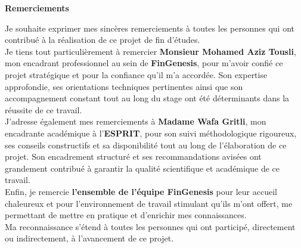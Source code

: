 \begin{titlepage}
\begin{center}

\vspace*{6cm} %

\textbf{\Large Remerciements}

\vspace{1cm}

\begin{itshape} %

Je souhaite exprimer mes sincères remerciements à toutes les personnes qui ont contribué à la réalisation de ce projet de fin d'études.\\[0.7cm]

Je tiens tout particulièrement à remercier \textbf{Monsieur Mohamed Aziz Tousli}, mon encadrant professionnel au sein de \textbf{FinGenesis}, pour m'avoir confié ce projet stratégique et pour la confiance qu'il m'a accordée. Son expertise approfondie, ses orientations techniques pertinentes ainsi que son accompagnement constant tout au long du stage ont été déterminants dans la réussite de ce travail.\\[0.5cm]

J'adresse également mes remerciements à \textbf{Madame Wafa Gritli}, mon encadrante académique à l'\textbf{ESPRIT}, pour son suivi méthodologique rigoureux, ses conseils constructifs et sa disponibilité tout au long de l'élaboration de ce projet. Son encadrement structuré et ses recommandations avisées ont grandement contribué à garantir la qualité scientifique et académique de ce travail.\\[0.5cm]

Enfin, je remercie \textbf{l'ensemble de l'équipe FinGenesis} pour leur accueil chaleureux et pour l'environnement de travail stimulant qu'ils m'ont offert, me permettant de mettre en pratique et d'enrichir mes connaissances.\\[0.5cm]

Ma reconnaissance s'étend à toutes les personnes qui ont participé, directement ou indirectement, à l'avancement de ce projet.

\end{itshape}

\vfill

\end{center}
\end{titlepage}
